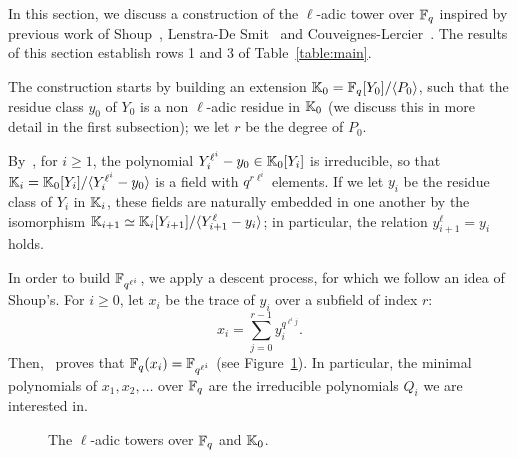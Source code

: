 \documentclass{sig-alternate}
\begin{document}
In this section, we discuss a construction of the $\ell$-adic tower
over $\mathbb{F}_q$ inspired by previous work of Shoup~\cite{Shoup90,shoup94},
Lenstra-De Smit~\cite{lenstra+desmit08-stdmodels} and
Couveignes-Lercier~\cite{couveignes+lercier11}. The results of this
section establish rows 1 and 3 of Table~\ref{table:main}.

The construction starts by building an extension $\mathbb{K}_0 =
\mathbb{F}_q[Y_0]/\langle P_0 \rangle$, such that the residue class $y_0$ of
$Y_0$ is a non $\ell$-adic residue in $\mathbb{K}_0$ (we discuss this in more
detail in the first subsection); we let $r$ be the degree of
$P_0$.

By~\cite[Th.~VI.9.1]{lang}, for $i\ge 1$, the polynomial
$Y_i^{\ell^i}-y_0 \in \mathbb{K}_0[Y_i]$ is irreducible, so that $\mathbb{K}_i=
\mathbb{K}_0[Y_i]/\langle Y_i^{\ell^i}-y_0\rangle$ is a field with $q^{r
  \ell^i}$ elements.  If we let $y_i$ be the residue class of $Y_i$ in
$\mathbb{K}_i$, these fields are naturally embedded in one another by the
isomorphism $\mathbb{K}_{i+1} \simeq \mathbb{K}_i[Y_{i+1}]/\langle
Y_{i+1}^\ell-y_i\rangle$; in particular, the relation
$y_{i+1}^\ell=y_i$ holds.

In order to build $\mathbb{F}_{q^{\ell^i}}$, we apply a descent process, for
which we follow an idea of Shoup's. For $i \ge 0$, let $x_i$ be the
trace of $y_i$ over a subfield of index $r$:
\begin{equation}\label{eq-def:xi}
x_i = \sum_{j = 0}^{r-1} y_i^{q^{\ell^i j}}.  
\end{equation}
Then,~\cite[Th.~2.1]{Shoup90} proves that $\mathbb{F}_q(x_i)=\mathbb{F}_{q^{\ell^i}}$
(see Figure~\ref{fig:ladic}). In particular,
the minimal polynomials of $x_1,x_2,\dots$ over $\mathbb{F}_q$ are
the irreducible polynomials $Q_i$ we are interested in.

\begin{figure}[h]
  \centering
  \caption{The $\ell$-adic towers over $\mathbb{F}_q$ and $\mathbb{K}_0$.}
  \label{fig:ladic}
\end{figure}
\end{document}
